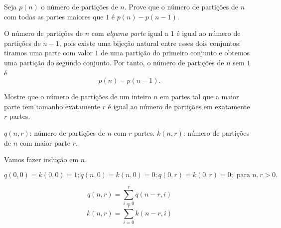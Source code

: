 \documentclass[10pt, a4paper]{article}
\begin{document}
	\begin{prob}
		Seja $p(n)$ o número de partições de $n$. Prove que o número de partições de $n$ com todas as partes maiores que $1$ é $p(n) - p(n-1)$.
	\end{prob}

	\begin{sol}
		O número de partições de $n$ com \emph{alguma parte} igual a $1$ é igual ao número de partições de $n-1$, pois existe uma bijeção natural entre esses dois conjuntos: tiramos uma parte com valor $1$ de uma partição do primeiro conjunto e obtemos uma partição do segundo conjunto.
		Por tanto, o número de partições de $n$ sem $1$ é \[p(n) - p(n-1).\]
	\end{sol}

	\newpage

	\begin{prob}
		Mostre que o número de partições de um inteiro $n$ em partes tal que a maior parte tem tamanho exatamente $r$ é igual ao número de partições em exatamente $r$ partes.
	\end{prob}

	\begin{sol}[Recorrência]
		$q(n, r)$: número de partições de $n$ com $r$ partes. $k(n, r)$: número de partições de $n$ com maior parte $r$.

		Vamos fazer indução em $n$. 

		\[ q(0,0) = k(0,0) = 1; q(n, 0) = k(n, 0) = 0; q(0, r) = k(0, r) = 0; \text{ para $n, r > 0$.}\]

		\[ q(n, r) = \sum_{i=0}^{r} q(n-r, i)\]
		\[ k(n, r) = \sum_{i=0}^{r} k(n-r, i)\]
	\end{sol}
\end{document}
